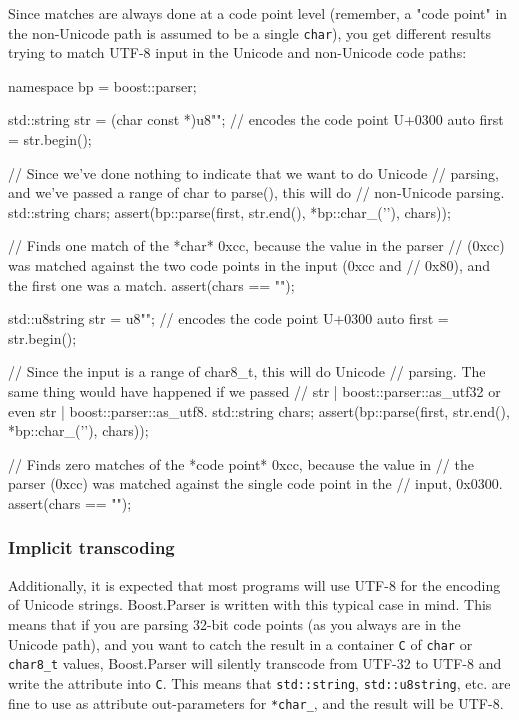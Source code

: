 Since matches are always done at a code point level (remember, a "code point" in the non-Unicode path is assumed to be a single \texttt{char}), you get different results trying to match UTF-8 input in the Unicode and non-Unicode code paths:

\begin{code}
namespace bp = boost::parser;

{
    std::string str = (char const *)u8"\xcc{}"; // encodes the code point U+0300
    auto first = str.begin();

    // Since we've done nothing to indicate that we want to do Unicode
    // parsing, and we've passed a range of char to parse(), this will do
    // non-Unicode parsing.
    std::string chars;
    assert(bp::parse(first, str.end(), *bp::char_('\xcc'), chars));

    // Finds one match of the *char* 0xcc, because the value in the parser
    // (0xcc) was matched against the two code points in the input (0xcc and
    // 0x80), and the first one was a match.
    assert(chars == "\xcc");
}
{
    std::u8string str = u8"\xcc{}"; // encodes the code point U+0300
    auto first = str.begin();

    // Since the input is a range of char8_t, this will do Unicode
    // parsing.  The same thing would have happened if we passed
    // str | boost::parser::as_utf32 or even str | boost::parser::as_utf8.
    std::string chars;
    assert(bp::parse(first, str.end(), *bp::char_('\xcc'), chars));

    // Finds zero matches of the *code point* 0xcc, because the value in
    // the parser (0xcc) was matched against the single code point in the
    // input, 0x0300.
    assert(chars == "");
}
\end{code}

\subsubsection{Implicit transcoding}

Additionally, it is expected that most programs will use UTF-8 for the encoding of Unicode strings. Boost.Parser is written with this typical case in mind. This means that if you are parsing 32-bit code points (as you always are in the Unicode path), and you want to catch the result in a container \texttt{C} of \texttt{char} or \texttt{char8\_t} values, Boost.Parser will silently transcode from UTF-32 to UTF-8 and write the attribute into \texttt{C}. This means that \texttt{std::string}, \texttt{std::u8string}, etc. are fine to use as attribute out-parameters for \texttt{*char\_}, and the result will be UTF-8.

